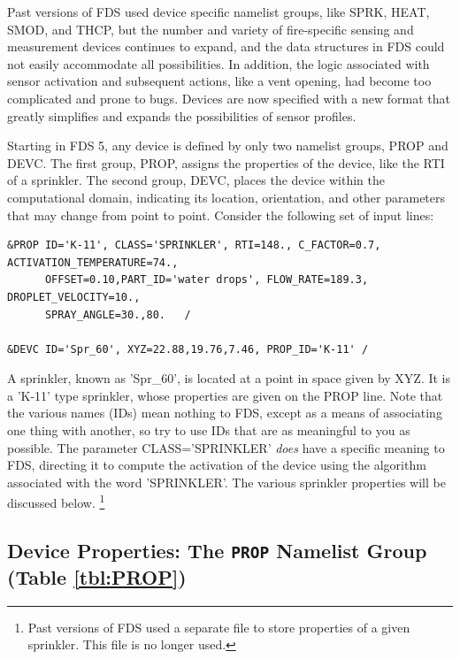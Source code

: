 \documentclass[11pt]{book}
\begin{document}
Past versions of FDS used device specific namelist groups, like {\ct SPRK},
{\ct HEAT}, {\ct SMOD}, and {\ct THCP}, but the number and variety
of fire-specific sensing and measurement devices continues to expand, and
the data structures in FDS could not easily accommodate all possibilities.
In addition, the logic associated with sensor activation and
subsequent actions, like a vent opening, had become too complicated and prone to bugs.
Devices are now specified with a new format that greatly simplifies and expands the possibilities of sensor profiles.

Starting in FDS 5, any device is defined by only two namelist groups, {\ct PROP} and {\ct DEVC}.
The first group, {\ct PROP}, assigns the properties of the device, like the RTI of a sprinkler.
The second group, {\ct DEVC}, places the device within the computational domain,
indicating its location, orientation, and other parameters that may change from point to point. Consider the following set of input lines:

\footnotesize
\begin{verbatim}
&PROP ID='K-11', CLASS='SPRINKLER', RTI=148., C_FACTOR=0.7, ACTIVATION_TEMPERATURE=74.,
      OFFSET=0.10,PART_ID='water drops', FLOW_RATE=189.3, DROPLET_VELOCITY=10.,
      SPRAY_ANGLE=30.,80.   /

&DEVC ID='Spr_60', XYZ=22.88,19.76,7.46, PROP_ID='K-11' /
\end{verbatim} \normalsize

\noindent
A sprinkler, known as {\ct 'Spr\_60'}, is located at a point in space given by {\ct XYZ}. It is a {\ct 'K-11'} type sprinkler, whose properties are given on
the {\ct PROP} line. Note that the various names ({\ct ID}s) mean nothing to FDS, except as a means of associating one thing with another, so try to use {\ct ID}s that are as
meaningful to you as possible.  The parameter {\ct CLASS='SPRINKLER'} {\em does} have a specific meaning to FDS, directing it to compute the activation of
the device using the algorithm associated with the word {\ct 'SPRINKLER'}. The various sprinkler properties will be discussed below.
\footnote{Past versions of FDS used a separate file to store
properties of a given sprinkler. This file is no longer used.}


\subsection{Device Properties: The \texorpdfstring{{\tt PROP}}{PROP} Namelist Group (Table \ref{tbl:PROP})}
\label{info:PROP}
\end{document}
